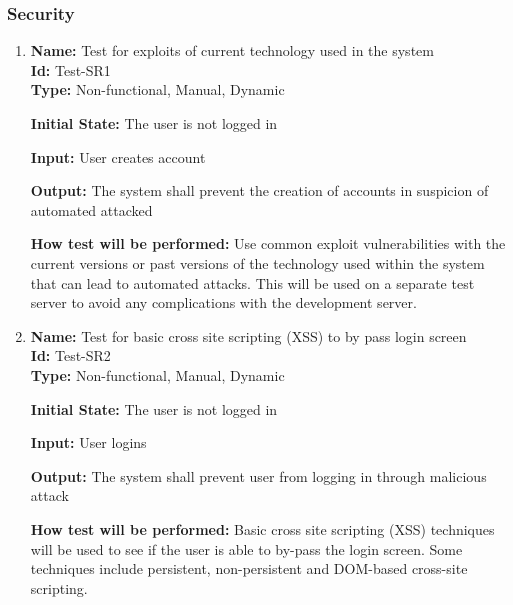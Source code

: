 \documentclass[12pt, titlepage]{article}
\begin{document}
\subsubsection{Security}
\begin{enumerate}
    \item{\textbf{Name:} Test for exploits of current technology used in the system\\} \label{Test-SR1}
   \textbf{Id: }Test-SR1\\
   
    \textbf{Type:} Non-functional, Manual, Dynamic
    					
    \textbf{Initial State:} The user is not logged in
    					
    \textbf{Input:} User creates account
    					
    \textbf{Output:} The system shall prevent the creation of accounts in suspicion of automated attacked
    					
    \textbf{How test will be performed:} Use common exploit vulnerabilities with the current versions or past versions of the technology used within the system that can lead to automated attacks. This will be used on a separate test server to avoid any complications with the development server.
    
    \item{\textbf{Name:} Test for basic cross site scripting (XSS) to by pass login screen\\} \label{Test-SR2}
    \textbf{Id:} Test-SR2\\
    
    \textbf{Type:} Non-functional, Manual, Dynamic
    					
    \textbf{Initial State:} The user is not logged in
    					
    \textbf{Input:} User logins
    					
    \textbf{Output:} The system shall prevent user from logging in through malicious attack
    					
    \textbf{How test will be performed:} Basic cross site scripting (XSS) techniques will be used to see if the user is able to by-pass the login screen. Some techniques include persistent, non-persistent and DOM-based cross-site scripting.
    
    
    					

\end{enumerate}
\end{document}

